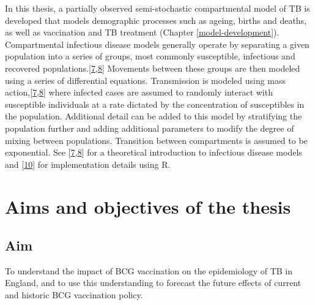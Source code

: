\documentclass[11pt,twoside]{bristolthesis}
\begin{document}
  In this thesis, a partially observed semi-stochastic compartmental model of TB is developed that models demographic processes such as ageing, births and deaths, as well as vaccination and TB treatment (Chapter \ref{model-development}). Compartmental infectious disease models generally operate by separating a given population into a series of groups, most commonly susceptible, infectious and recovered populations.{[}\protect\hyperlink{ref-Anderson1991}{7},\protect\hyperlink{ref-Keeling2007}{8}{]} Movements between these groups are then modeled using a series of differential equations. Transmission is modeled using mass action,{[}\protect\hyperlink{ref-Anderson1991}{7},\protect\hyperlink{ref-Keeling2007}{8}{]} where infected cases are assumed to randomly interact with susceptible individuals at a rate dictated by the concentration of susceptibles in the population. Additional detail can be added to this model by stratifying the population further and adding additional parameters to modify the degree of mixing between populations. Transition between compartments is assumed to be exponential. See {[}\protect\hyperlink{ref-Anderson1991}{7},\protect\hyperlink{ref-Keeling2007}{8}{]} for a theoretical introduction to infectious disease models and {[}\protect\hyperlink{ref-King2016}{10}{]} for implementation details using R.
  
  \hypertarget{aims-and-objectives-of-the-thesis}{%
  \section{Aims and objectives of the thesis}\label{aims-and-objectives-of-the-thesis}}
  
  \hypertarget{aim}{%
  \subsection{Aim}\label{aim}}
  
  To understand the impact of BCG vaccination on the epidemiology of TB in England, and to use this understanding to forecast the future effects of current and historic BCG vaccination policy.
  
\end{document}
